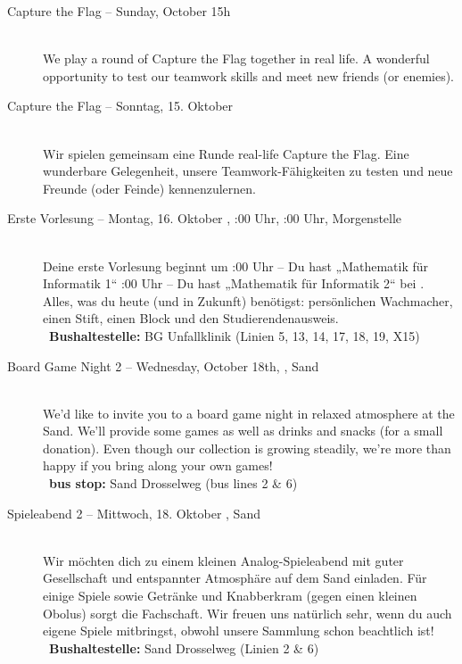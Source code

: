 \begin{description}
\ifml
	\item[Capture the Flag -- Sunday, October 15h \YEAR]~\\%
	We play a round of Capture the Flag together in real life.
	A wonderful opportunity to test our teamwork skills and meet new friends (or enemies).
\else
	\item[Capture the Flag -- Sonntag, 15. Oktober \YEAR]~\\%
	Wir spielen gemeinsam eine Runde real-life Capture the Flag.
	Eine wunderbare Gelegenheit, unsere Teamwork-Fähigkeiten zu testen und neue Freunde (oder Feinde) kennenzulernen.
\fi

\ifbachelor
	\item[Erste Vorlesung -- Montag, 16. Oktober \YEAR, \ifwintersemester 8:00 Uhr, \else 10:00 Uhr, \fi Morgenstelle]~\\
	Deine erste Vorlesung beginnt um
	:00 Uhr -- Du hast „Mathematik für Informatik 1“  \fi
	:00 Uhr -- Du hast „Mathematik für Informatik 2“  \fi
	bei \Matheprof.
	Alles, was du heute (und in Zukunft) benötigst: persönlichen Wachmacher, einen Stift, einen Block und den Studierendenausweis.\\
	~\textbf{Bushaltestelle:} BG Unfallklinik (Linien 5, 13, 14, 17, 18, 19, X15)
\fi

\ifml
	\item[Board Game Night 2 -- Wednesday, October 18th, \YEAR, Sand]~\\%
	We'd like to invite you to a board game night in relaxed atmosphere at the Sand.
    We'll provide some games as well as drinks and snacks (for a small donation).
    Even though our collection is growing steadily, we're more than happy if you bring along your own games!\\
	~\textbf{bus stop:} Sand Drosselweg (bus lines 2 \& 6)
\else
    \item[Spieleabend 2 -- Mittwoch, 18. Oktober \YEAR, Sand]~\\%
	Wir möchten dich zu einem kleinen Analog-Spieleabend mit guter Gesellschaft und entspannter Atmosphäre auf dem Sand einladen.
    Für einige Spiele sowie Getränke und Knabberkram (gegen einen kleinen Obolus) sorgt die Fachschaft.
    Wir freuen uns natürlich sehr, wenn du auch eigene Spiele mitbringst, obwohl unsere Sammlung schon beachtlich ist!\\
	~\textbf{Bushaltestelle:} Sand Drosselweg (Linien 2 \& 6)
\fi


\end{description}

